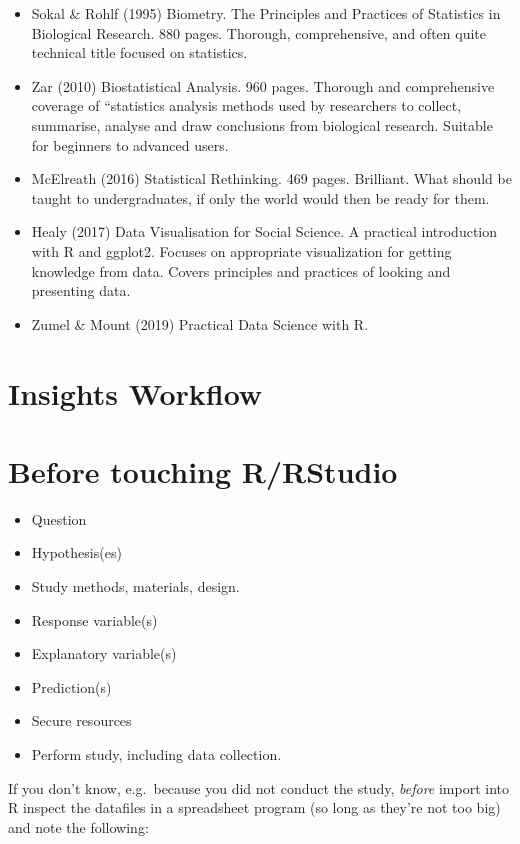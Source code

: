 \documentclass[]{book}
\providecommand{\tightlist}{%
  \setlength{\itemsep}{0pt}\setlength{\parskip}{0pt}}
\begin{document}
\begin{itemize}
\item
  Sokal \& Rohlf (1995) Biometry. The Principles and Practices of Statistics in Biological Research. 880 pages. Thorough, comprehensive, and often quite technical title focused on statistics.
\item
  Zar (2010) Biostatistical Analysis. 960 pages. Thorough and comprehensive coverage of ``statistics analysis methods used by researchers to collect, summarise, analyse and draw conclusions from biological research. Suitable for beginners to advanced users.
\item
  McElreath (2016) Statistical Rethinking. 469 pages. Brilliant. What should be taught to undergraduates, if only the world would then be ready for them.
\item
  Healy (2017) Data Visualisation for Social Science. A practical introduction with R and ggplot2. Focuses on appropriate visualization for getting knowledge from data. Covers principles and practices of looking and presenting data.
\item
  Zumel \& Mount (2019) Practical Data Science with R.
\end{itemize}

\hypertarget{insights-workflow}{%
\chapter{Insights Workflow}\label{insights-workflow}}

\hypertarget{before-touching-rrstudio}{%
\chapter{Before touching R/RStudio}\label{before-touching-rrstudio}}

\begin{itemize}
\tightlist
\item
  Question
\item
  Hypothesis(es)
\item
  Study methods, materials, design.
\item
  Response variable(s)
\item
  Explanatory variable(s)
\item
  Prediction(s)
\item
  Secure resources
\item
  Perform study, including data collection.
\end{itemize}

If you don't know, e.g.~because you did not conduct the study, \emph{before} import into R inspect the datafiles in a spreadsheet program (so long as they're not too big) and note the following:
\end{document}
